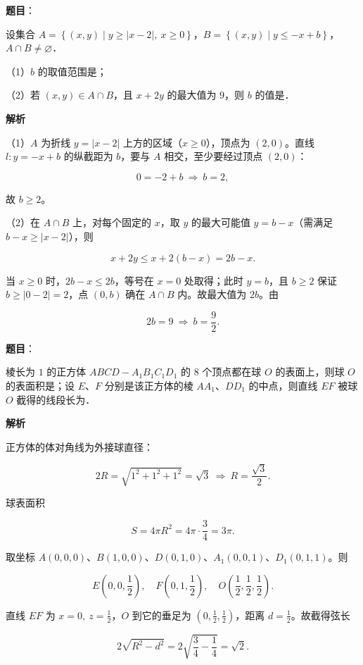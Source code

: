\begin{answer}

\textbf{题目}：

设集合 $A=\left\{(x,y)\mid y\geqslant|x-2|,\ x\geqslant0\right\}$，$B=\left\{(x,y)\mid y\leqslant-x+b\right\}$，$A\cap B\neq\varnothing$．

（1）$b$ 的取值范围是\gkblank{}；

（2）若 $(x,y)\in A\cap B$，且 $x+2y$ 的最大值为 $9$，则 $b$ 的值是\gkblank{}．

\textbf{解析}

（1）$A$ 为折线 $y=|x-2|$ 上方的区域（$x\geqslant0$），顶点为 $(2,0)$。直线 $l:y=-x+b$ 的纵截距为 $b$，要与 $A$ 相交，至少要经过顶点 $(2,0)$：

\nopagebreak[4]
\[0=-2+b\ \Longrightarrow\ b=2,\]

故 $b\geqslant2$。

（2）在 $A\cap B$ 上，对每个固定的 $x$，取 $y$ 的最大可能值 $y=b-x$（需满足 $b-x\geqslant|x-2|$），则

\nopagebreak[4]
\[x+2y\leqslant x+2(b-x)=2b-x .\]

当 $x\geqslant0$ 时，$2b-x\leqslant2b$，等号在 $x=0$ 处取得；此时 $y=b$，且 $b\geqslant2$ 保证 $b\geqslant|0-2|=2$，点 $(0,b)$ 确在 $A\cap B$ 内。故最大值为 $2b$。由

\nopagebreak[4]
\[2b=9\ \Longrightarrow\ b=\frac92 .\]


\end{answer}
\begin{answer}

\textbf{题目}：

棱长为 $1$ 的正方体 $ABCD-A_1B_1C_1D_1$ 的 $8$ 个顶点都在球 $O$ 的表面上，则球 $O$ 的表面积是\gkblank{}；设 $E$、$F$ 分别是该正方体的棱 $AA_1$、$DD_1$ 的中点，则直线 $EF$ 被球 $O$ 截得的线段长为\gkblank{}．

\textbf{解析}

正方体的体对角线为外接球直径：

\nopagebreak[4]
\[2R=\sqrt{1^2+1^2+1^2}=\sqrt3\ \Longrightarrow\ R=\frac{\sqrt3}{2}.\]

球表面积

\nopagebreak[4]
\[S=4\pi R^2=4\pi\cdot\frac34=3\pi .\]

取坐标 $A(0,0,0)$、$B(1,0,0)$、$D(0,1,0)$、$A_1(0,0,1)$、$D_1(0,1,1)$。则

\nopagebreak[4]
\[E\left(0,0,\frac12\right),\quad F\left(0,1,\frac12\right),\quad O\left(\frac12,\frac12,\frac12\right).\]

直线 $EF$ 为 $x=0,\ z=\frac12$，$O$ 到它的垂足为 $\left(0,\frac12,\frac12\right)$，距离 $d=\frac12$。故截得弦长

\nopagebreak[4]
\[2\sqrt{R^2-d^2}=2\sqrt{\frac34-\frac14}=\sqrt2 .\]


\end{answer}
